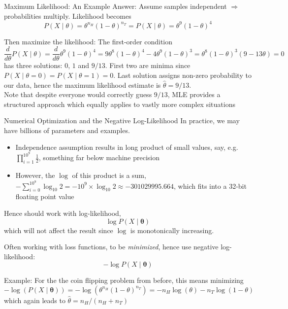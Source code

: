 {\begin{frame}{Maximum Likelihood: An Example}
        Answer: Assume samples independent $\Rightarrow$ probabilities multiply. Likelihood becomes
        $$P(X \mid \theta) = \theta^{n_H}(1-\theta)^{n_T} = P(X \mid \theta) = \theta^9(1-\theta)^4$$

        Then maximize the likelihood: The first-order condition
        $$
            \frac{d}{d\theta} P(X \mid \theta)
                = \frac{d}{d\theta} \theta^9(1-\theta)^4        
                = 9\theta^8(1-\theta)^4 - 4\theta^9(1-\theta)^3
                = \theta^8(1-\theta)^3(9-13\theta)
                = 0
        $$
        has three solutions: $0$, $1$ and $9/13$. First two are minima since
        $P(X\mid \theta=0) = P(X\mid \theta=1) = 0$. Last solution assigns non-zero probability
        to our data, hence the maximum likelihood estimate is $\hat \theta = 9/13.$\\
        {\tiny Note that despite everyone would correctly guess $9/13$, MLE provides
        a structured approach which equally applies to vastly more complex situations}

    \end{frame}

    \begin{frame}{Numerical Optimization and the Negative Log-Likelihood}
        In practice, we may have billions of parameters and examples.
        \begin{itemize}
            \item Independence assumption results in long product of small values, say, e.g.
                  $\prod_{i=1}^{10^9} \frac12$, something far below machine precision
            \item However, the $\log$ of this product is a sum,
                  $-\sum_{i=0}^{10^9} \log_{10} 2 = -10^9 \times \log_{10} 2 \approx -301029995.664$,
                  which fits into a 32-bit floating point value
        \end{itemize}

        Hence should work with log-likelihood,
        $$\log P(X \mid \boldsymbol{\theta})$$
        which will not affect the result since $\log$ is monotonically increasing.

        Often working with loss functions, to be \emph{minimized}, hence use negative log-likelihood:
        $$-\log P(X \mid \boldsymbol{\theta})$$

        Example: For the the coin flipping problem from before, this means minimizing
        $$-\log(P(X \mid \boldsymbol{\theta})) = -\log(\theta^{n_H}(1-\theta)^{n_T}) = -n_H\log(\theta) - n_T\log(1-\theta)$$
        which again leads to $\hat{\theta} = n_H/(n_H + n_T)$
    \end{frame}

}
